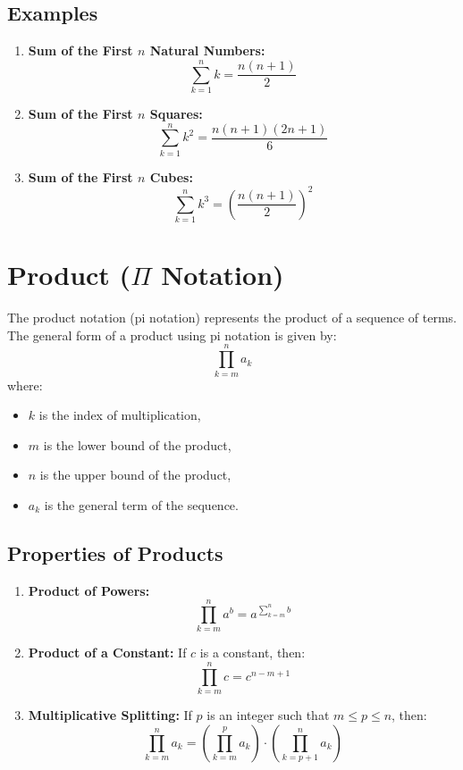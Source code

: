 \documentclass{article}
\begin{document}
\subsection{Examples}
\begin{enumerate}
    \item \textbf{Sum of the First \(n\) Natural Numbers:}
    \[
    \sum_{k=1}^{n} k = \frac{n(n+1)}{2}
    \]
    
    \item \textbf{Sum of the First \(n\) Squares:}
    \[
    \sum_{k=1}^{n} k^2 = \frac{n(n+1)(2n+1)}{6}
    \]
    
    \item \textbf{Sum of the First \(n\) Cubes:}
    \[
    \sum_{k=1}^{n} k^3 = \left(\frac{n(n+1)}{2}\right)^2
    \]
\end{enumerate}

\section{Product (\(\Pi\) Notation)}
The product notation (pi notation) represents the product of a sequence of terms. The general form of a product using pi notation is given by:
\[
\prod_{k = m}^{n} a_k
\]
where:
\begin{itemize}
    \item \(k\) is the index of multiplication,
    \item \(m\) is the lower bound of the product,
    \item \(n\) is the upper bound of the product,
    \item \(a_k\) is the general term of the sequence.
\end{itemize}

\subsection{Properties of Products}
\begin{enumerate}
    \item \textbf{Product of Powers:}
    \[
    \prod_{k=m}^{n} a^b = a^{\sum_{k=m}^{n} b}
    \]
    
    \item \textbf{Product of a Constant:}
    If \(c\) is a constant, then:
    \[
    \prod_{k=m}^{n} c = c^{n-m+1}
    \]
    
    \item \textbf{Multiplicative Splitting:}
    If \(p\) is an integer such that \(m \leq p \leq n\), then:
    \[
    \prod_{k=m}^{n} a_k = \left(\prod_{k=m}^{p} a_k\right) \cdot \left(\prod_{k=p+1}^{n} a_k\right)
    \]
\end{enumerate}
\end{document}
